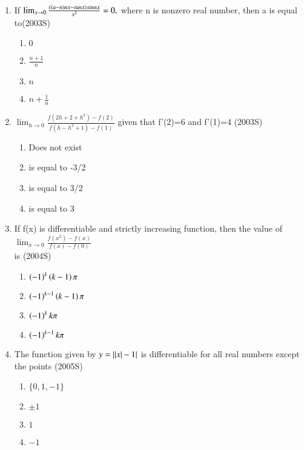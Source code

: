 \documentclass[journal,12pt,twocolumn]{IEEEtran}
\theoremstyle{remark}
\begin{document}
\begin{enumerate}
\item %

	If $\lim_{x \to 0} \frac{\left(\left(a-n\right)nx-tanx\right)sinnx}{x^2} =0,$ where n is nonzero real number, then a is equal\\ to\hfill{(2003S)}
    \begin{enumerate}
     \item $0$
     \item $\frac{n+1}{n}$
     \item $n$
     \item $n+\frac{1}{n}$\\
    \end{enumerate}


\item %

    $\lim_{h \to 0} \frac{f(2h+2+h^2)-f(2)}{f(h-h^2+1)-f(1)}$ given that f'(2)=6 and f'(1)=4 \hfill{(2003S)}
    \begin{enumerate}
     \item Does not exist
     \item is equal to -3/2
     \item is equal to 3/2
     \item is equal to 3\\
    \end{enumerate}


\item %

If f(x) is differentiable and strictly increasing function, then the value of $\lim_{x \to 0} \frac{f(x^2)-f(x)}{f(x)-f(0)}$\\ is \hfill{(2004S)}
    \begin{enumerate}
	    \item $\left(-1\right)^k \left(k-1\right) \pi$
	    \item $\left(-1\right)^{k-1} \left(k-1\right) \pi$
	    \item $\left(-1\right)^k k\pi$
            \item $\left(-1\right)^{k-1} k\pi$\\
    \end{enumerate}


\item %

	The function given by $y=\left\vert\left\vert x\right\vert-1\right\vert$ is differentiable for all real numbers except the points \hfill{(2005S)}
    \begin{enumerate}
     \item $\{0,1,-1\}$
     \item $\pm 1$
     \item $1$
     \item $-1$\\
    \end{enumerate}


\end{enumerate}
\end{document}
